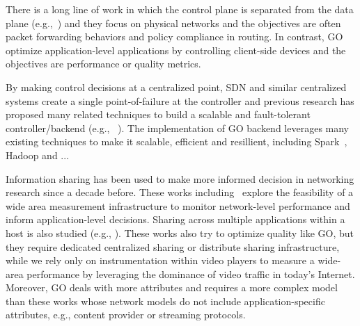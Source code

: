 
 There is a long line of work in which the control plane is separated from the data plane (e.g.,~\cite{rcp,onix,4d,openflow}) and they focus on physical networks and the objectives are often packet forwarding behaviors and policy compliance in routing. In contrast, GO optimize application-level applications by controlling client-side devices and the objectives are performance or quality metrics.  

 By making control decisions at a centralized point, SDN and similar centralized systems create a single point-of-failure at the controller and previous research has proposed many related techniques to build a scalable and fault-tolerant controller/backend (e.g., ~\cite{tootoonchian2012controller,yan2007tesseract}). The implementation of GO backend leverages many existing techniques to make it scalable, efficient and resillient, including Spark~\cite{spark}, Hadoop and ...

 Information sharing has been used to make more informed decision in networking research since a decade before. These works including~\cite{stemm2000network,choffnes2010crowdsourcing} explore the feasibility of a wide area measurement infrastructure to monitor network-level performance and inform application-level decisions. Sharing across multiple applications within a host is also studied (e.g., \cite{balakrishnan1999integrated}). These works also try to optimize quality like GO, but they require dedicated centralized sharing or distribute sharing infrastructure, while we rely only on instrumentation within video players to measure a wide-area performance by leveraging the dominance of video traffic in today's Internet. Moreover, GO deals with more attributes and requires a more complex model than these works whose network models do not include application-specific attributes, e.g., content provider or streaming protocols.